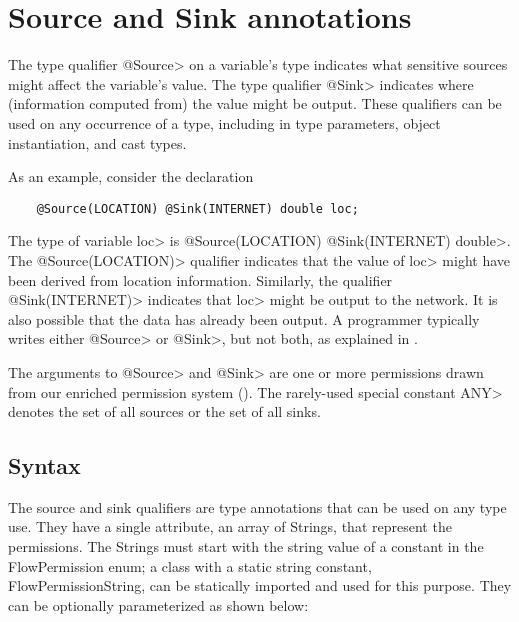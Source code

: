\section{Source and Sink annotations\label{sec:flow-type-system}}

The type qualifier \<@Source> on a variable's
type indicates what sensitive sources might affect the variable's value.
The type qualifier \<@Sink> indicates where (information computed from) the
value might be output.
These qualifiers can be used on any occurrence
of a type, including in type parameters, object instantiation, and cast types.


As an example, consider the declaration

\begin{Verbatim}
    @Source(LOCATION) @Sink(INTERNET) double loc;
\end{Verbatim}

\noindent
The type of variable \<loc> is \<@Source(LOCATION) @Sink(INTERNET)
double>.
The \<@Source(LOCATION)> qualifier indicates that the
value of \<loc> might have been derived from
location information.
Similarly, the qualifier \<@Sink(INTERNET)> indicates that
\<loc> might be output to the network.  It is also
possible that the data has already been output.
A programmer typically writes either \<@Source> or \<@Sink>, but not both, as explained
in  . 

The arguments to \<@Source> and \<@Sink> are one or more permissions
drawn from our enriched permission system ().
The rarely-used special constant \<ANY> denotes the set of all sources or the set of all
sinks.

\subsection{Syntax\label{sec:flow-anno-syntax}}
The source and sink qualifiers are type annotations that can be used on any type use.  They have a single attribute, an array of Strings, that represent the permissions.  The Strings must start with the string value of a constant in the FlowPermission enum; a class with a static string constant, FlowPermissionString, can be statically imported and used for this purpose. They can be optionally parameterized as shown below:

